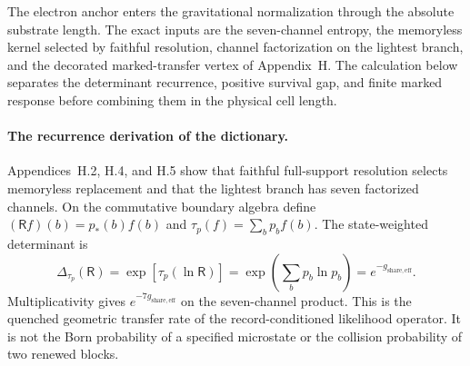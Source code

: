 \documentclass[11pt]{article}
\begin{document}
The electron anchor enters the gravitational normalization through the absolute substrate length. The exact inputs are the seven-channel entropy, the memoryless kernel selected by faithful resolution, channel factorization on the lightest branch, and the decorated marked-transfer vertex of Appendix~H. The calculation below separates the determinant recurrence, positive survival gap, and finite marked response before combining them in the physical cell length.

\paragraph{The recurrence derivation of the dictionary.}
Appendices~H.2, H.4, and H.5 show that faithful full-support resolution selects memoryless replacement and that the lightest branch has seven factorized channels. On the commutative boundary algebra define $(\mathsf Rf)(b)=p_*(b)f(b)$ and $\tau_p(f)=\sum_bp_bf(b)$. The state-weighted determinant is
\[
\Delta_{\tau_p}(\mathsf R)
=\exp[\tau_p(\ln\mathsf R)]
=\exp\!\left(\sum_bp_b\ln p_b\right)
=e^{-g_{\mathrm{share,eff}}}.
\]
Multiplicativity gives $e^{-7g_{\mathrm{share,eff}}}$ on the seven-channel product. This is the quenched geometric transfer rate of the record-conditioned likelihood operator. It is not the Born probability of a specified microstate or the collision probability of two renewed blocks.
\end{document}
